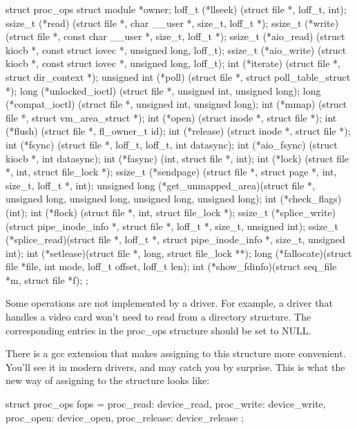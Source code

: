 \documentclass[10pt, oneside]{book}
\begin{document}
\begin{code}
struct proc_ops {
    struct module *owner;
    loff_t (*llseek) (struct file *, loff_t, int);
    ssize_t (*read) (struct file *, char __user *, size_t, loff_t *);
    ssize_t (*write) (struct file *, const char __user *, size_t, loff_t *);
    ssize_t (*aio_read) (struct kiocb *, const struct iovec *, unsigned long, loff_t);
    ssize_t (*aio_write) (struct kiocb *, const struct iovec *, unsigned long, loff_t);
    int (*iterate) (struct file *, struct dir_context *);
    unsigned int (*poll) (struct file *, struct poll_table_struct *);
    long (*unlocked_ioctl) (struct file *, unsigned int, unsigned long);
    long (*compat_ioctl) (struct file *, unsigned int, unsigned long);
    int (*mmap) (struct file *, struct vm_area_struct *);
    int (*open) (struct inode *, struct file *);
    int (*flush) (struct file *, fl_owner_t id);
    int (*release) (struct inode *, struct file *);
    int (*fsync) (struct file *, loff_t, loff_t, int datasync);
    int (*aio_fsync) (struct kiocb *, int datasync);
    int (*fasync) (int, struct file *, int);
    int (*lock) (struct file *, int, struct file_lock *);
    ssize_t (*sendpage) (struct file *, struct page *, int, size_t, loff_t *, int);
    unsigned long (*get_unmapped_area)(struct file *, unsigned long, unsigned long, unsigned long, unsigned long);
    int (*check_flags)(int);
    int (*flock) (struct file *, int, struct file_lock *);
    ssize_t (*splice_write)(struct pipe_inode_info *, struct file *, loff_t *, size_t, unsigned int);
    ssize_t (*splice_read)(struct file *, loff_t *, struct pipe_inode_info *, size_t, unsigned int);
    int (*setlease)(struct file *, long, struct file_lock **);
    long (*fallocate)(struct file *file, int mode, loff_t offset,
	      loff_t len);
    int (*show_fdinfo)(struct seq_file *m, struct file *f);
};
\end{code}

Some operations are not implemented by a driver. For example, a driver that handles a video card won't need to read from a directory structure. The corresponding entries in the proc\_ops structure should be set to NULL.

There is a gcc extension that makes assigning to this structure more convenient. You'll see it in modern drivers, and may catch you by surprise. This is what the new way of assigning to the structure looks like:

\begin{code}
struct proc_ops fops = {
	proc_read: device_read,
	proc_write: device_write,
	proc_open: device_open,
	proc_release: device_release
};
\end{code}
\end{document}
